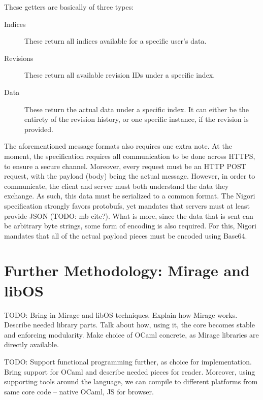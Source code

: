 \begin{description}
\begin{description}
    These getters are basically of three types:
    \begin{description}
      \item[Indices] These return all indices available for a specific user's data.
      \item[Revisions] These return all available revision IDs under a specific index.
      \item[Data] These return the actual data under a specific index.
      It can either be the entirety of the revision history, or one specific instance, if the revision is provided.
    \end{description}
  \end{description}
\end{description}

The aforementioned message formats also requires one extra note.
At the moment, the specification requires all communication to be done across HTTPS, to ensure a secure channel.
Moreover, every request must be an HTTP POST request, with the payload (body) being the actual message.
However, in order to communicate, the client and server must both understand the data they exchange.
As such, this data must be serialized to a common format.
The Nigori specification strongly favors protobufs, yet mandates that servers must at least provide JSON (TODO: mb cite?).
What is more, since the data that is sent can be arbitrary byte strings, some form of encoding is also required.
For this, Nigori mandates that all of the actual payload pieces must be encoded using Base64.

\section{Further Methodology: Mirage and libOS}
TODO: Bring in Mirage and libOS techniques. Explain how Mirage works. Describe needed library parts. Talk about how, using it, the core becomes stable and enforcing modularity. Make choice of OCaml concrete, as Mirage libraries are directly available.

TODO: Support functional programming further, as choice for implementation. Bring support for OCaml and describe needed pieces for reader. Moreover, using supporting tools around the language, we can compile to different platforms from same core code -- native OCaml, JS for browser.
